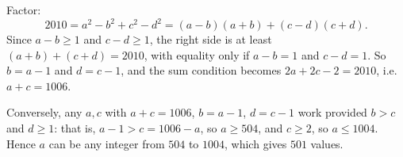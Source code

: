 Factor:
\[
2010=a^2-b^2+c^2-d^2=(a-b)(a+b)+(c-d)(c+d).
\]
Since $a-b\ge1$ and $c-d\ge1$, the right side is at least $(a+b)+(c+d)=2010$, with equality only if $a-b=1$ and $c-d=1$. So $b=a-1$ and $d=c-1$, and the sum condition becomes $2a+2c-2=2010$, i.e.\ $a+c=1006$.

Conversely, any $a,c$ with $a+c=1006$, $b=a-1$, $d=c-1$ work provided $b>c$ and $d\ge1$: that is, $a-1>c=1006-a$, so $a\ge504$, and $c\ge2$, so $a\le1004$. Hence $a$ can be any integer from $504$ to $1004$, which gives $\boxed{501}$ values.
